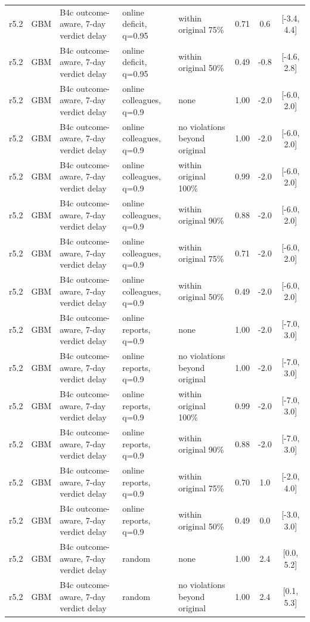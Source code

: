 \begin{longtable}{lllp{4.2cm}p{3.4cm}ccc}
r5.2 & GBM & B4c outcome-aware, 7-day verdict delay & online deficit, q=0.95 & within original 75\% & 0.71 & 0.6 & [-3.4, 4.4] \\
r5.2 & GBM & B4c outcome-aware, 7-day verdict delay & online deficit, q=0.95 & within original 50\% & 0.49 & -0.8 & [-4.6, 2.8] \\
r5.2 & GBM & B4c outcome-aware, 7-day verdict delay & online colleagues, q=0.9 & none & 1.00 & -2.0 & [-6.0, 2.0] \\
r5.2 & GBM & B4c outcome-aware, 7-day verdict delay & online colleagues, q=0.9 & no violations beyond original & 1.00 & -2.0 & [-6.0, 2.0] \\
r5.2 & GBM & B4c outcome-aware, 7-day verdict delay & online colleagues, q=0.9 & within original 100\% & 0.99 & -2.0 & [-6.0, 2.0] \\
r5.2 & GBM & B4c outcome-aware, 7-day verdict delay & online colleagues, q=0.9 & within original 90\% & 0.88 & -2.0 & [-6.0, 2.0] \\
r5.2 & GBM & B4c outcome-aware, 7-day verdict delay & online colleagues, q=0.9 & within original 75\% & 0.71 & -2.0 & [-6.0, 2.0] \\
r5.2 & GBM & B4c outcome-aware, 7-day verdict delay & online colleagues, q=0.9 & within original 50\% & 0.49 & -2.0 & [-6.0, 2.0] \\
r5.2 & GBM & B4c outcome-aware, 7-day verdict delay & online reports, q=0.9 & none & 1.00 & -2.0 & [-7.0, 3.0] \\
r5.2 & GBM & B4c outcome-aware, 7-day verdict delay & online reports, q=0.9 & no violations beyond original & 1.00 & -2.0 & [-7.0, 3.0] \\
r5.2 & GBM & B4c outcome-aware, 7-day verdict delay & online reports, q=0.9 & within original 100\% & 0.99 & -2.0 & [-7.0, 3.0] \\
r5.2 & GBM & B4c outcome-aware, 7-day verdict delay & online reports, q=0.9 & within original 90\% & 0.88 & -2.0 & [-7.0, 3.0] \\
r5.2 & GBM & B4c outcome-aware, 7-day verdict delay & online reports, q=0.9 & within original 75\% & 0.70 & 1.0 & [-2.0, 4.0] \\
r5.2 & GBM & B4c outcome-aware, 7-day verdict delay & online reports, q=0.9 & within original 50\% & 0.49 & 0.0 & [-3.0, 3.0] \\
r5.2 & GBM & B4c outcome-aware, 7-day verdict delay & random & none & 1.00 & 2.4 & [0.0, 5.2] \\
r5.2 & GBM & B4c outcome-aware, 7-day verdict delay & random & no violations beyond original & 1.00 & 2.4 & [0.1, 5.3] \\

\end{longtable}
